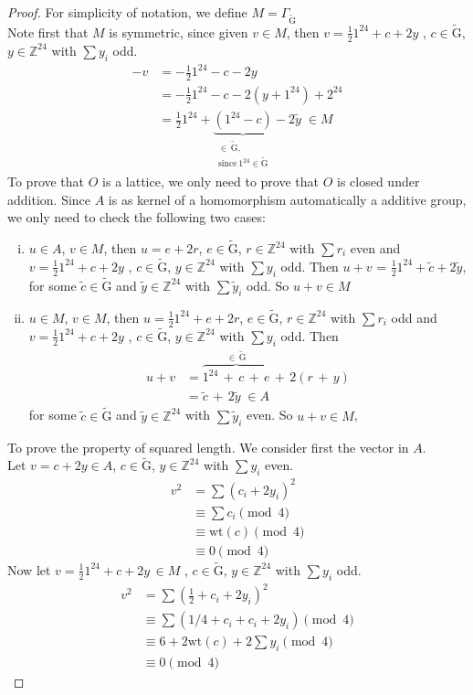 \documentclass[12pt]{article}
\theoremstyle{definition}
\numberwithin{equation}{theorem}
\numberwithin{figure}{theorem}
\newcommand{\cCodes}{\ensuremath{\widetilde{\mathrm{G}}}}
\newcommand{\buildLattice}[1]{\ensuremath{\Gamma_{#1}}}
\newcommand{\wt}[1]{\ensuremath{\text{wt}(#1)}}
\newcommand{\Integer}{\ensuremath{\mathbb{Z}}}
\begin{document}
\begin{proof}
For simplicity of notation, we define $M = \buildLattice{\cCodes}$\\
Note first that $M$ is symmetric, since given $v \in M$, then $v = \frac{1}{2}1^{24} + c + 2y$ , $c \in \cCodes$, $y \in \Integer^{24}$ with $\sum{y_i}$ odd. 
\begin{align*}	
 -v &= -\frac{1}{2}1^{24} - c - 2y\\
 	&= -\frac{1}{2}1^{24} - c - 2(y + 1^{24}) + 2^{24}\\
 	&= \frac{1}{2}1^{24} + \underbrace{(1^{24} - c)}_{\substack{\in \,\cCodes, \\ \text{since} \, 1^{24} \in \cCodes}} - 2\tilde{y} \;\in M 
\end{align*}
To prove that $O$ is a lattice,  we only need to prove that $O$ is closed under addition. Since $A$ is as kernel of a homomorphism automatically a additive group, we only need to check the following two cases:
\begin{enumerate}[i)]
	\item $u \in A$, $v \in M$, then $u = e + 2r$, $e \in \cCodes$, $r \in \Integer^{24}$ with $\sum r_i $ even and $v = \frac{1}{2}1^{24} + c + 2y$ , $c \in \cCodes$, $y \in \Integer^{24}$ with $\sum{y_i}$ odd. Then $u + v$ = $\frac{1}{2}1^{24} + \tilde{c} + 2\tilde{y}$, for some $\tilde{c} \in \cCodes$ and $\tilde{y} \in \Integer^{24}$ with $\sum{\tilde{y}_i}$ odd. So $u + v \in M$
	\item $u \in M$, $v \in M$, then $u = \frac{1}{2}1^{24}+ e + 2r$, $e \in \cCodes$, $r \in \Integer^{24}$ with $\sum r_i $ odd and $v = \frac{1}{2}1^{24} + c + 2y$ , $c \in \cCodes$, $y \in \Integer^{24}$ with $\sum{y_i}$ odd. Then 
	\begin{align*}
	u + v &= \overbrace{1^{24}\, +\, c \,+ \,e}^{\in \,\cCodes}\, +\, 2(r\, + \,y)\\
		 &= \tilde{c}\, + \,2\tilde{y} \; \in A
	\end{align*}
	for some $\tilde{c} \in \cCodes$ and $\tilde{y} \in \Integer^{24}$ with $\sum{\tilde{y}_i}$ even. So $u + v \in M$, 
\end{enumerate}
To prove the property of squared length. We consider first the vector in $A$.\\
Let $v = c + 2y \in A$, $c \in \cCodes$, $y \in \Integer^{24}$ with $\sum{y_i}$ even.
\begin{align*}
	v^2 &= \sum(c_i + 2y_i)^2 \\
		&\equiv \sum c_i \pmod 4\\
		&\equiv \wt{c} \pmod 4 \\
		&\equiv 0 \pmod 4
\end{align*}
Now let $v = \frac{1}{2}1^{24} + c + 2y \, \in M$ , $c \in \cCodes$, $y \in \Integer^{24}$ with $\sum{y_i}$ odd.
\begin{align*}
	v^2 &= \sum(\frac{1}{2} + c_i + 2y_i)^2 \\
		&\equiv \sum(1/4 + c_i + c_i + 2y_i) \pmod 4\\
		&\equiv 6 + 2\wt{c} + 2\sum{y_i} \pmod 4 \\
		&\equiv 0 \pmod 4
\end{align*}
\end{proof}
\end{document}
